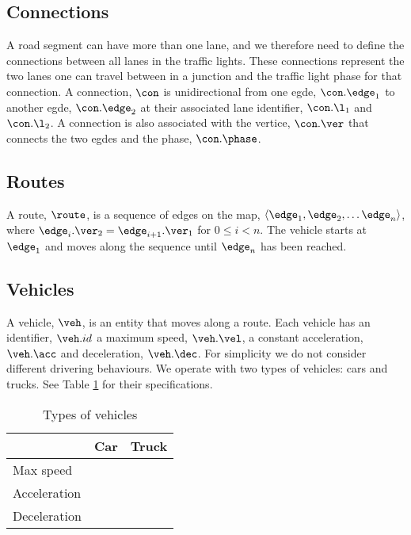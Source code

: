 \subsection{Connections}
A road segment can have more than one lane, and we therefore need to define the connections between all lanes in the traffic lights.
These connections represent the two lanes one can travel between in a junction and the traffic light phase for that connection.
A connection, $\con$ is unidirectional from one egde, $\con.\edge_1$ to another egde, $\con.\edge_2$ at their associated lane identifier, $\con.\l_1$ and $\con.\l_2$. A connection is also associated with the vertice, $\con.\ver$ that connects the two egdes and the phase, $\con.\phase$.



\begin{comment}
\subsection{Trajectory}
A trajectory, $T$, is a sequence of connected edges on the map, $\langle e_1, e_2, \dots e_n \rangle$, where $e_i.v_2 = e_{i+1}.v_1$ for $0\leq i< n$.
The vehicle starts at $e_1$ and moves along the sequence until $e_n$ has been reached.
\end{comment}

\subsection{Routes}
A route, $\route$, is a sequence of edges on the map, $\langle \edge_1, \edge_2, \dots \edge_n \rangle$, where $\edge_i.\ver_2 = \edge_{i+1}.\ver_1$ for $0\leq i< n$.
The vehicle starts at $\edge_1$ and moves along the sequence until $\edge_n$ has been reached.

\subsection{Vehicles}
A vehicle, $\veh$, is an entity that moves along a route.
Each vehicle has an identifier, $\veh.id$ a maximum speed, $\veh.\vel$, a constant acceleration, $\veh.\acc$ and deceleration, $\veh.\dec$.
For simplicity we do not consider different drivering behaviours.
We operate with two types of vehicles: cars and trucks. See Table \ref{table.vehicleTypes} for their specifications.
\begin{table}
\centering
\begin{tabular}{|l|l|l|}\hline
		& Car	& Truck \\\hline
Max speed 	& 	& \\\hline
Acceleration 	&	& \\\hline
Deceleration 	&	& \\\hline
\end{tabular}
\caption{Types of vehicles}\label{table.vehicleTypes}
\end{table}


